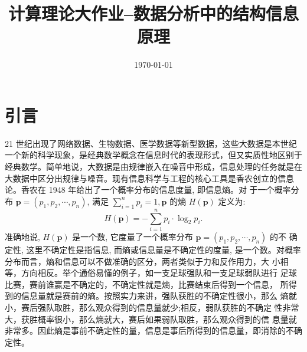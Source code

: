 \documentclass[a4paper]{apa6}
\date{\today}
\title{计算理论大作业--数据分析中的结构信息原理}
\begin{document}
\maketitle

\section{引言}
\label{sec:orgbb1ae0d}
21 世纪出现了网络数据、生物数据、医学数据等新型数据，这些大数据是本世纪一个新的科学现象，是经典数学概念在信息时代的表现形式，但又实质性地区别于经典数学。简单地说，大数据是由规律嵌入在噪音中形成，信息处理的任务就是在大数据中区分出规律与噪音。现有信息科学与工程的核心工具是香农创立的信息论。香农在 1948 年给出了一个概率分布的信息度量, 即信息熵。对 于一个概率分布 \(\boldsymbol{p}=\left(p_{1}, p_{2}, \cdots, p_{n}\right)\), 满足 \(\sum_{i=1}^{n} p_{i}=1, \boldsymbol{p}\) 的熵 \(H(\boldsymbol{p})\) 定义为:
$$
H(\boldsymbol{p})=-\sum_{i=1}^{n} p_{i} \cdot \log _{2} p_{i} .
$$
准确地说, \(H(\boldsymbol{p})\) 是一个数, 它度量了一个概率分布 \(\boldsymbol{p}=\left(p_{1}, p_{2}, \cdots, p_{n}\right)\) 的不 确定性, 这里不确定性是指信息, 而熵或信息量是不确定性的度量, 是一个数。对概率分布而言，熵和信息可以不做准确的区分，两者类似于力和反作用力，大 小相等，方向相反。举个通俗易懂的例子，如一支足球强队和一支足球弱队进行 足球比赛，赛前谁赢是不确定的，不确定性就是熵，比赛结束后得到一个信息， 所得到的信息量就是赛前的熵。按照实力来讲，强队获胜的不确定性很小，那么 熵就小，赛后强队取胜，那么观众得到的信息量就少;相反，弱队获胜的不确定 性非常大，获胜概率很小，那么熵就大，赛后如果弱队取胜，那么观众得到的信 息量就非常多。因此熵是事前不确定性的量，信息是事后所得到的信息量，即消除的不确定性。
\end{document}
